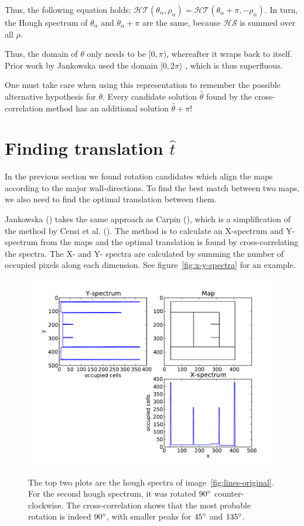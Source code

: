 Thus, the following equation holds: $\mathcal{HT}(\theta_\alpha, \rho_\alpha) = \mathcal{HT}(\theta_\alpha + \pi, -\rho_\alpha)$. In turn, the Hough spectrum of $\theta_\alpha$ and $\theta_\alpha + \pi$ are the same, because $\mathcal{HS}$ is summed over all $\rho$. 

Thus, the domain of $\theta$ only needs to be $[0, \pi)$, whereafter it wraps back to itself. Prior work by Jankowska used the domain $[0, 2\pi\rangle$ \cite{jankowska}, which is thus superfluous.

One must take care when using this representation to remember the possible alternative hypothesis for $\theta$. Every candidate solution $\hat\theta$ found by the cross-correlation method has an additional solution $\hat\theta + \pi$!

\section{Finding translation $\hat t$}
In the previous section we found rotation candidates which align the maps according to the major wall-directions. To find the best match between two maps, we also need to find the optimal translation between them. 

Jankowska (\cite{jankowska2009hough}) takes the same approach as Carpin (\cite{carpin2008merging}), which is a simplification of the method by Censi et al. (\cite{sensi2005scan}). The method is to calculate an X-spectrum and Y-spectrum from the maps and the optimal translation is found by cross-correlating the spectra. The X- and Y- spectra are calculated by summing the number of occupied pixels along each dimension. See figure~\ref{fig:x-y-spectra} for an example.

\begin{figure}[ht]
	\centering
	\includegraphics[width=\textwidth]{images/stitching/x_y_spectra.pdf}
	\label{fig:room-partial}
	\caption{The top two plots are the hough spectra of image~\ref{fig:lines-original}. For the second hough spectrum, it was rotated $90\degree$ counter-clockwise. The cross-correlation shows that the most probable rotation is indeed $90\degree$, with smaller peaks for $45\degree$ and $135\degree$.}
\end{figure}

